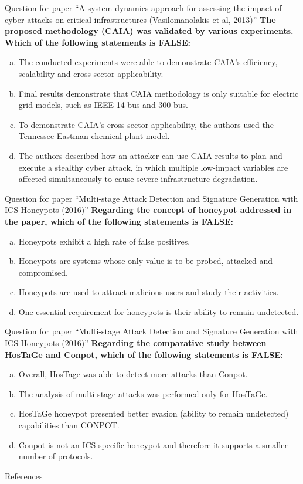 \documentclass[compress]{beamer}
\begin{document}
\begin{frame}{Question for paper ``A system dynamics approach for assessing the impact of cyber attacks on critical infrastructures (Vasilomanolakis et al, 2013)''}
      \textbf{The proposed methodology (CAIA) was validated by various experiments. Which of the following statements is FALSE:}
      \begin{enumerate}[(a)]
       \item The conducted experiments were able to demonstrate CAIA's efficiency, scalability and cross-sector applicability.
       \item Final results demonstrate that CAIA methodology is only suitable for electric grid models, such as IEEE 14-bus and 300-bus.
       \item To demonstrate CAIA's cross-sector applicability, the authors used the Tennessee Eastman chemical plant model.
       \item The authors described how an attacker can use CAIA results to plan and execute a stealthy cyber attack, in which multiple low-impact variables are affected simultaneously to cause severe infrastructure degradation.
      \end{enumerate}
\end{frame}

\begin{frame}{Question for paper ``Multi-stage Attack Detection and Signature Generation with ICS Honeypots (2016)''}
      \textbf{Regarding the concept of honeypot addressed in the paper, which of the following statements is FALSE:}
      \begin{enumerate}[(a)]
       \item Honeypots exhibit a high rate of false positives.
       \item Honeypots are systems whose only value is to be probed, attacked and compromised.
       \item Honeypots are used to attract malicious users and study their activities.
       \item One essential requirement for honeypots is their ability to remain undetected.
      \end{enumerate}
\end{frame}

\begin{frame}{Question for paper ``Multi-stage Attack Detection and Signature Generation with ICS Honeypots (2016)''}
      \textbf{Regarding the comparative study between HosTaGe and Conpot, which of the following statements is FALSE:}
      \begin{enumerate}[(a)]
       \item Overall, HosTage was able to detect more attacks than Conpot.
       \item The analysis of multi-stage attacks was performed only for HosTaGe.
       \item HosTaGe honeypot presented better evasion (ability to remain undetected) capabilities than CONPOT.
       \item Conpot is not an ICS-specific honeypot and therefore it supports a smaller number of protocols.
      \end{enumerate}
\end{frame}

\begin{frame}[allowframebreaks]{References}
\def\newblock{}
\printbibliography{}

\end{frame}
\end{document}
